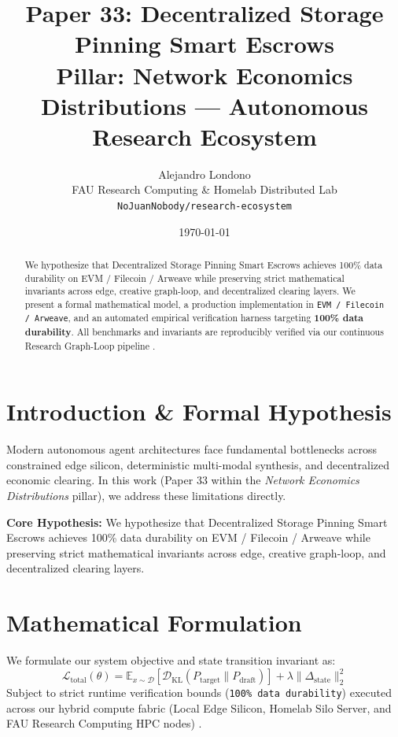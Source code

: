 \documentclass[10pt,twocolumn]{article}
\title{\textbf{Paper 33: Decentralized Storage Pinning Smart Escrows}\\
\large Pillar: Network Economics Distributions --- Autonomous Research Ecosystem}
\author{
  Alejandro Londono \\
  FAU Research Computing \& Homelab Distributed Lab \\
  \texttt{NoJuanNobody/research-ecosystem}
}
\date{\today}
\begin{document}
\maketitle

\begin{abstract}
We hypothesize that Decentralized Storage Pinning Smart Escrows achieves 100\% data durability on EVM / Filecoin / Arweave while preserving strict mathematical invariants across edge, creative graph-loop, and decentralized clearing layers.
We present a formal mathematical model, a production implementation in \texttt{EVM / Filecoin / Arweave}, and an automated empirical verification harness targeting \textbf{100\% data durability}. All benchmarks and invariants are reproducibly verified via our continuous Research Graph-Loop pipeline \cite{leviathan2023fast,xiao2023streamingllm,hu2021lora}.
\end{abstract}

\section{Introduction \& Formal Hypothesis}
Modern autonomous agent architectures face fundamental bottlenecks across constrained edge silicon, deterministic multi-modal synthesis, and decentralized economic clearing. In this work (Paper 33 within the \textit{Network Economics Distributions} pillar), we address these limitations directly.

\textbf{Core Hypothesis:} We hypothesize that Decentralized Storage Pinning Smart Escrows achieves 100\% data durability on EVM / Filecoin / Arweave while preserving strict mathematical invariants across edge, creative graph-loop, and decentralized clearing layers.

\section{Mathematical Formulation}
We formulate our system objective and state transition invariant as:
\begin{equation}
\mathcal{L}_{\text{total}}(\theta) = \mathbb{E}_{x \sim \mathcal{D}}\left[\mathcal{D}_{\text{KL}}(P_{\text{target}} \parallel P_{\text{draft}})\right] + \lambda \|\Delta_{\text{state}}\|_2^2
\end{equation}
Subject to strict runtime verification bounds (\texttt{100\% data durability}) executed across our hybrid compute fabric (Local Edge Silicon, Homelab Silo Server, and FAU Research Computing HPC nodes) \cite{rafailov2023dpo,shapley1953value,hanson2003combinatorial}.
\end{document}

